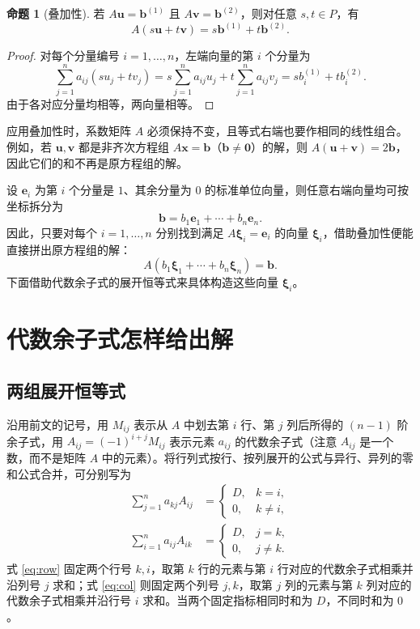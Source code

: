\documentclass[UTF8, fontset=fandol, a4paper, 12pt]{ctexart}
\theoremstyle{definition}
\newtheorem{proposition}[definition]{命题}
\begin{document}
\begin{proposition}[叠加性]
若 $A\boldsymbol u=\boldsymbol b^{(1)}$ 且 $A\boldsymbol v=\boldsymbol b^{(2)}$，则对任意 $s,t\in P$，有
\[
 A(s\boldsymbol u+t\boldsymbol v)
 =s\boldsymbol b^{(1)}+t\boldsymbol b^{(2)}.
\]
\end{proposition}
\begin{proof}
对每个分量编号 $i=1,\ldots,n$，左端向量的第 $i$ 个分量为
\[
 \sum_{j=1}^n a_{ij}(su_j+tv_j)
 =s\sum_{j=1}^n a_{ij}u_j+t\sum_{j=1}^n a_{ij}v_j
 =sb_i^{(1)}+tb_i^{(2)}.
\]
由于各对应分量均相等，两向量相等。
\end{proof}

应用叠加性时，系数矩阵 $A$ 必须保持不变，且等式右端也要作相同的线性组合。例如，若 $\boldsymbol u,\boldsymbol v$ 都是非齐次方程组 $A\boldsymbol x=\boldsymbol b$（$\boldsymbol b\ne\boldsymbol0$）的解，则 $A(\boldsymbol u+\boldsymbol v)=2\boldsymbol b$，因此它们的和不再是原方程组的解。

设 $\boldsymbol e_i$ 为第 $i$ 个分量是 $1$、其余分量为 $0$ 的标准单位向量，则任意右端向量均可按坐标拆分为
\[
 \boldsymbol b=b_1\boldsymbol e_1+\cdots+b_n\boldsymbol e_n.
\]
因此，只要对每个 $i=1,\ldots,n$ 分别找到满足 $A\boldsymbol\xi_i=\boldsymbol e_i$ 的向量 $\boldsymbol\xi_i$，借助叠加性便能直接拼出原方程组的解：
\[
 A(b_1\boldsymbol\xi_1+\cdots+b_n\boldsymbol\xi_n)=\boldsymbol b.
\]
下面借助代数余子式的展开恒等式来具体构造这些向量 $\boldsymbol\xi_i$。

\section{代数余子式怎样给出解}

\subsection{两组展开恒等式}

沿用前文的记号，用 $M_{ij}$ 表示从 $A$ 中划去第 $i$ 行、第 $j$ 列后所得的 $(n-1)$ 阶余子式，用 $A_{ij}=(-1)^{i+j}M_{ij}$ 表示元素 $a_{ij}$ 的代数余子式（注意 $A_{ij}$ 是一个数，而不是矩阵 $A$ 中的元素）。将行列式按行、按列展开的公式与异行、异列的零和公式合并，可分别写为
\begin{align}
 \sum_{j=1}^n a_{kj}A_{ij}
 &=\begin{cases}D,&k=i,\\0,&k\ne i,\end{cases}
 \label{eq:row}\\
 \sum_{i=1}^n a_{ij}A_{ik}
 &=\begin{cases}D,&j=k,\\0,&j\ne k.\end{cases}
 \label{eq:col}
\end{align}
式 \eqref{eq:row} 固定两个行号 $k,i$，取第 $k$ 行的元素与第 $i$ 行对应的代数余子式相乘并沿列号 $j$ 求和；式 \eqref{eq:col} 则固定两个列号 $j,k$，取第 $j$ 列的元素与第 $k$ 列对应的代数余子式相乘并沿行号 $i$ 求和。当两个固定指标相同时和为 $D$，不同时和为 $0$。
\end{document}
